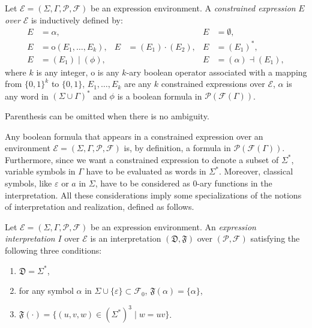 \documentclass[a4paper]{llncs}
\begin{document}
    
  \begin{definition}
    Let $\mathcal{E}=(\Sigma,\Gamma,\mathcal{P},\mathcal{F})$ be an expression environment. A \emph{constrained expression} $E$ \emph{over} $\mathcal{E}$ is inductively defined by:
    \begin{align*}
      E&=\alpha,&&& E&=\emptyset,\\
      E&=\mathrm{o}(E_1,\ldots,E_k),& E&=(E_1)\cdot (E_2),& E&=(E_1)^*,\\
      E&=(E_1)\mid(\phi),&&& E&=(\alpha) \dashv (E_1),
    \end{align*}
    where $k$ is any integer, $\mathrm{o}$ is any $k$-ary boolean operator associated with a mapping from $\{0,1\}^k$ to $\{0,1\}$, $E_1,\ldots,E_k$ are any $k$ constrained expressions over $\mathcal{E}$, $\alpha$ is any word in $(\Sigma\cup \Gamma)^*$ and $\phi$ is a boolean formula in $\mathcal{P}(\mathcal{F}(\Gamma))$.
  \end{definition}  
\noindent  
  Parenthesis can be omitted when there is no ambiguity.
  
  Any boolean formula that appears in a constrained expression over an environment $\mathcal{E}=(\Sigma,\Gamma,\mathcal{P},\mathcal{F})$ is, by definition, a formula in $\mathcal{P}(\mathcal{F}(\Gamma))$. Furthermore, since we want a constrained expression to denote  a subset of $\Sigma^*$, variable symbols in $\Gamma$ have to be evaluated as words in $\Sigma^*$. Moreover, classical symbols, like $\varepsilon$ or $a$ in $\Sigma$, have to be considered as $0$-ary functions in the interpretation. All these considerations imply some specializations of the notions of
interpretation and realization, defined as follows.
  
  \begin{definition}
    Let $\mathcal{E}=(\Sigma,\Gamma,\mathcal{P},\mathcal{F})$ be an expression environment. An \emph{expression interpretation} $I$ over $\mathcal{E}$ is an interpretation $(\mathfrak{D},\mathfrak{F})$ over $(\mathcal{P},\mathcal{F})$ satisfying the following three conditions:
    \begin{enumerate}
      \item $\mathfrak{D}=\Sigma^*$,
      \item for any symbol $\alpha$ in $\Sigma\cup\{\varepsilon\}\subset \mathcal{F}_0$, $\mathfrak{F}(\alpha)=\{\alpha\}$, 
      \item $\mathfrak{F}(\cdot)=\{(u,v,w)\in(\Sigma^*)^3\mid w=uv\}$.
    \end{enumerate}
  \end{definition} 
  
\end{document}
